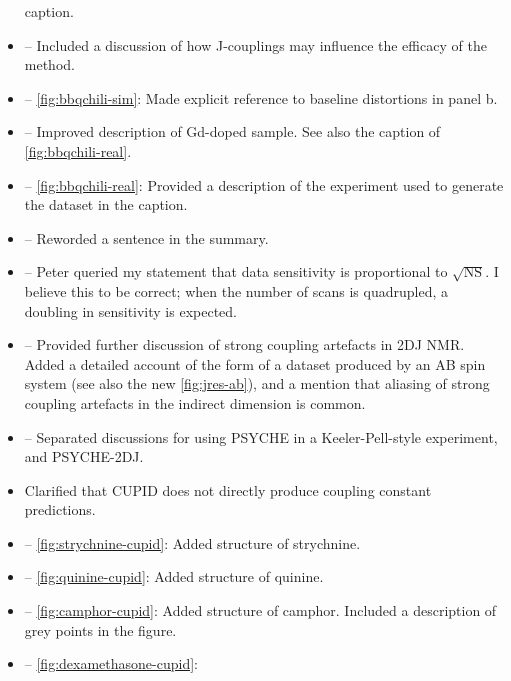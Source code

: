 \documentclass[12pt]{article}
\begin{document}
\begin{itemize}
            caption.
        \item {} -- Included a discussion of how
            J-couplings may influence the efficacy of the method.
        \item {} -- \cref{fig:bbqchili-sim}: Made
            explicit reference to baseline distortions in panel b.
        \item {} -- Improved description of Gd-doped sample.
            See also the caption of \cref{fig:bbqchili-real}.
        \item {} -- \cref{fig:bbqchili-real}:
            Provided a description of the experiment used to generate the
            dataset in the caption.
        \item {} -- Reworded a sentence in the summary.
        \item {} -- Peter queried my statement that data
            sensitivity is proportional to $\sqrt{\text{NS}}$. I believe this
            to be correct; when the number of scans is quadrupled, a doubling
            in sensitivity is expected.
        \item {} -- Provided further discussion
            of strong coupling artefacts in 2DJ NMR. Added a detailed
            account of the form of a dataset produced by an AB spin system (see
            also the new \cref{fig:jres-ab}), and a mention that aliasing of
            strong coupling artefacts in the indirect dimension is common.
        \item {} -- Separated discussions for using
            PSYCHE in a Keeler-Pell-style experiment, and PSYCHE-2DJ.
        \item {} Clarified that CUPID does not
            directly produce coupling constant predictions.
        \item {} -- \cref{fig:strychnine-cupid}: Added
            structure of strychnine.
        \item {} -- \cref{fig:quinine-cupid}: Added structure
            of quinine.
        \item {} -- \cref{fig:camphor-cupid}: Added structure
            of camphor. Included a description of grey points in
            the figure.
        \item {} -- \cref{fig:dexamethasone-cupid}:

\end{itemize}
\end{document}
